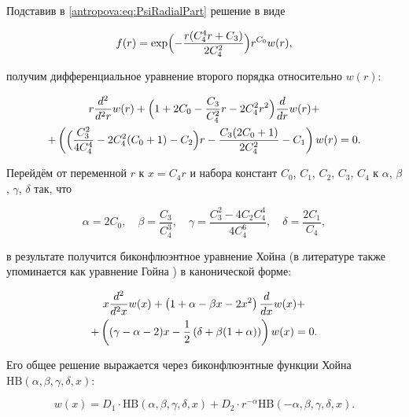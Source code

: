 Подставив в \eqref{antropova:eq:PsiRadialPart} решение в виде 

$$f(r)=\exp\Bigl({-\frac{r(C_4^4r + C_3)}{2C_4^2}}\Bigr)r^{C_0}w(r),$$ 

получим дифференциальное уравнение второго порядка относительно $w(r)$:

\begin{multline*}

r\antropovaDiffn{w(r)}{r}{2} + \Bigl(1 + 2C_0 - \frac{C_3}{C_4^2}r - 2C_4^2r^2\Bigr)\antropovaDiff{w(r)}{r}+\\

+\left(\Bigl(\frac{C_3^2}{4C_4^4} - 2C_4^2(C_0 + 1) - C_2\Bigr)r - \frac{C_3(2C_0 + 1)}{2C_4^2} - C_1\right)w(r) = 0 \text{.}

\end{multline*}



Перейдём от переменной $r$ к $x = C_4r$ и набора констант $C_0$, $C_1$, $C_2$, $C_3$, $C_4$ к $\alpha$, $\beta$, $\gamma$, $\delta$ так, что

\begin{equation}

\label{antropova:eq:GreekConst}

\alpha = 2C_0 , \quad  \beta = \frac{C_3}{C_4^3} , \quad  \gamma = \frac{C_3^2-4C_2C_4^4}{4C_4^6} , \quad  \delta = \frac{2C_1}{C_4} ,

\end{equation}

в результате получится биконфлюэнтное уравнение Хойна (в литературе также упоминается как уравнение Гойна \cite{antropova:bib:Slavyanov2002}) в канонической форме:

\begin{multline}

\label{antropova:eq:HeunBwx}

x\antropovaDiffn{w(x)}{x}{2} + \left(1 + \alpha - \beta{}x - 2x^2\right)\antropovaDiff{w(x)}{x} + \\

+ \left((\gamma - \alpha - 2)x - \frac{1}{2}\left(\delta + \beta(1 + \alpha)\right)\right)w(x) = 0 \text{.}

\end{multline}

Его общее решение выражается через биконфлюэнтные функции Хойна\linebreak $\text{HB}(\alpha,\beta,\gamma,\delta,x)$:

\begin{equation}\label{antropova:eq:wxHeun}

w(x) = D_1\cdot \text{HB}(\alpha,\beta,\gamma,\delta,x) + D_2\cdot r^{-\alpha}\text{HB}(-\alpha,\beta,\gamma,\delta,x).

\end{equation}



